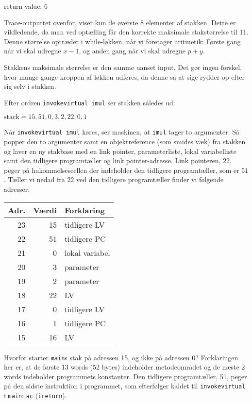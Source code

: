 \documentclass[12pt,a4paper]{article}
\newcommand{\imul}{\texttt{imul}}
\begin{document}
return value: 6

Trace-outputtet ovenfor, viser kun de øverste 8 elementer af stakken. Dette er
vildledende, da man ved optælling får den korrekte maksimale stakstørrelse til
11. Denne størrelse optræder i while-løkken, når vi foretager aritmetik: Første
gang når vi skal udregne $x-1$, og anden gang når vi skal udregne $p+y$.

Stakkens maksimale størrelse er den samme uanset input. Det gør ingen forskel,
hvor mange gange kroppen af løkken udføres, da denne så at sige rydder op efter
sig selv i stakken.

Efter ordren \texttt{invokevirtual imul} ser stakken således ud:

$\text{stack} = 15, 51, 0, 3, 2, 22, 0, 1$

Når \texttt{invokevirtual imul} køres, ser maskinen, at \imul{} tager to
argumenter. Så popper den to argumenter samt en objektreference (som smides
væk) fra stakken og laver en ny stakbase med en link pointer, parameterliste,
lokal variabelliste samt den tidligere programtæller og link pointer-adresse.
Link pointeren, $22$, peger på hukommelsescellen der indeholder den tidligere
programtæller, som er $51$. Tæller vi nedad fra $22$ ved den tidligere
programtæller finder vi følgende adresser:

\begin{tabular}{|r|r|l|}
	\hline
	Adr. & Værdi & Forklaring \\
	\hline
	23 & 15 & tidligere LV \\
	22 & 51 & tidligere PC \\
	21 & 0 & lokal variabel \\
	20 & 3 & parameter \\
	19 & 2 & parameter \\
	18 & 22 & LV \\
	\hline
	17 & 0 & tidligere LV \\
	16 & 1 & tidligere PC \\
	15 & 16 & LV \\
	\hline
\end{tabular}

Hvorfor starter \texttt{main}s stak på adressen 15, og ikke på adressen 0?
Forklaringen her er, at de første 13 words (52 bytes) indeholder metodeområdet
og de næste 2 words indeholder programmets konstanter. Den tidligere
programtæller, 51, peger på den sidste instruktion i programmet, som
efterfølger kaldet til \texttt{invokevirtual} i \texttt{main}: \texttt{ac}
(\texttt{ireturn}).
\end{document}
